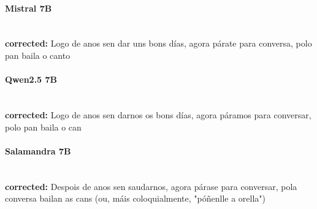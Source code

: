 \paragraph{Mistral 7B}~\\
\textbf{corrected:} Logo de anos sen dar uns bons días, agora párate para conversa, polo pan baila o canto

\paragraph{Qwen2.5 7B}~\\
\textbf{corrected:} Logo de anos sen darnos os bons días, agora páramos para conversar, polo pan baila o can

\paragraph{Salamandra 7B}~\\
\textbf{corrected:} Despois de anos sen saudarnos, agora párase para conversar, pola conversa bailan as cans (ou, máis coloquialmente, "póñenlle a orella")

\vspace{1em}
